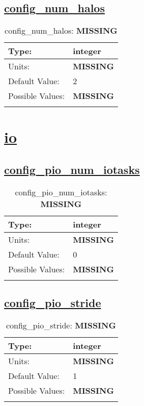 \subsection[config\_num\_halos]{\hyperref[sec:nm_tab_cice_model]{config\_num\_halos}}
\label{subsec:nm_sec_config_num_halos}
\begin{center}
\begin{longtable}{| p{2.0in} || p{4.0in} |}
    \hline
    Type: & integer \\
    \hline
    Units: & {\bf \color{red} MISSING} \\
    \hline
    Default Value: & 2 \\
    \hline
    Possible Values: & {\bf \color{red} MISSING} \\
    \hline
    \caption{config\_num\_halos: {\bf \color{red} MISSING}}
\end{longtable}
\end{center}
\section[io]{\hyperref[sec:nm_tab_io]{io}}
\label{sec:nm_sec_io}
\subsection[config\_pio\_num\_iotasks]{\hyperref[sec:nm_tab_io]{config\_pio\_num\_iotasks}}
\label{subsec:nm_sec_config_pio_num_iotasks}
\begin{center}
\begin{longtable}{| p{2.0in} || p{4.0in} |}
    \hline
    Type: & integer \\
    \hline
    Units: & {\bf \color{red} MISSING} \\
    \hline
    Default Value: & 0 \\
    \hline
    Possible Values: & {\bf \color{red} MISSING} \\
    \hline
    \caption{config\_pio\_num\_iotasks: {\bf \color{red} MISSING}}
\end{longtable}
\end{center}
\subsection[config\_pio\_stride]{\hyperref[sec:nm_tab_io]{config\_pio\_stride}}
\label{subsec:nm_sec_config_pio_stride}
\begin{center}
\begin{longtable}{| p{2.0in} || p{4.0in} |}
    \hline
    Type: & integer \\
    \hline
    Units: & {\bf \color{red} MISSING} \\
    \hline
    Default Value: & 1 \\
    \hline
    Possible Values: & {\bf \color{red} MISSING} \\
    \hline
    \caption{config\_pio\_stride: {\bf \color{red} MISSING}}
\end{longtable}
\end{center}
